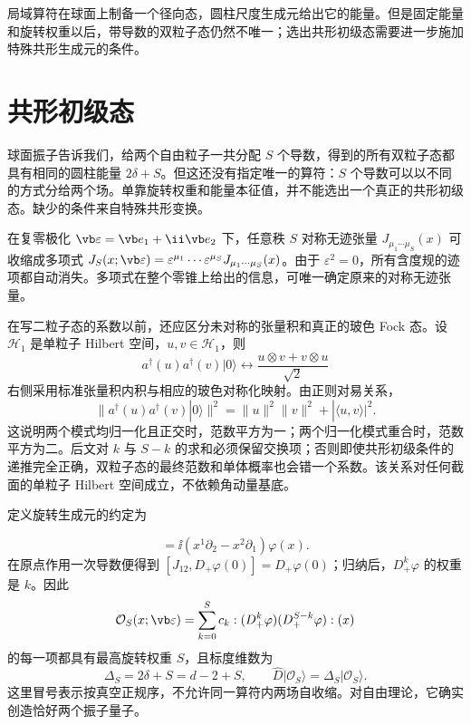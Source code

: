 

局域算符在球面上制备一个径向态，圆柱尺度生成元给出它的能量。但是固定能量和旋转权重以后，带导数的双粒子态仍然不唯一；选出共形初级态需要进一步施加特殊共形生成元的条件。

\section{共形初级态}
\label{sec:ghs-conformal-primary-bilinear}


球面振子告诉我们，给两个自由粒子一共分配 $S$ 个导数，得到的所有双粒子态都具有相同的圆柱能量 $2\delta+S$。但这还没有指定唯一的算符：$S$ 个导数可以以不同的方式分给两个场。单靠旋转权重和能量本征值，并不能选出一个真正的共形初级态。缺少的条件来自特殊共形变换。


在复零极化 $\vb\varepsilon=\vb e_1+\ii\vb e_2$ 下，任意秩 $S$ 对称无迹张量 $J_{\mu_1\cdots\mu_S}(x)$ 可收缩成多项式 $J_S(x;\vb\varepsilon)=\varepsilon^{\mu_1}\cdots\varepsilon^{\mu_S}J_{\mu_1\cdots\mu_S}(x)$。由于 $\varepsilon^2=0$，所有含度规的迹项都自动消失。多项式在整个零锥上给出的信息，可唯一确定原来的对称无迹张量。

在写二粒子态的系数以前，还应区分未对称的张量积和真正的玻色 Fock 态。设 $\mathcal H_1$ 是单粒子 Hilbert 空间，$u,v\in\mathcal H_1$，则
\[
 a^\dagger(u)a^\dagger(v)|0\rangle
 \longleftrightarrow \frac{u\otimes v+v\otimes u}{\sqrt2}
\]
右侧采用标准张量积内积与相应的玻色对称化映射。由正则对易关系，
\[
 \|a^\dagger(u)a^\dagger(v)|0\rangle\|^2
 =\|u\|^2\|v\|^2+|\langle u,v\rangle|^2.
\]
这说明两个模式均归一化且正交时，范数平方为一；两个归一化模式重合时，范数平方为二。后文对 $k$ 与 $S-k$ 的求和必须保留交换项；否则即使共形初级条件的递推完全正确，双粒子态的最终范数和单体概率也会错一个系数。该关系对任何截面的单粒子 Hilbert 空间成立，不依赖角动量基底。

定义旋转生成元的约定为




\begin{equation*}
 [J_{12},\varphi(x)]=\ii(x^1\partial_2-x^2\partial_1)\varphi(x).
\end{equation*}
在原点作用一次导数便得到 $[J_{12},D_+\varphi(0)]=D_+\varphi(0)$；归纳后，$D_+^k\varphi$ 的权重是 $k$。因此
\begin{equation}\label{eq:ghs-bilinear-general}
 \mathcal O_S(x;\vb\varepsilon)=\sum_{k=0}^{S}c_k:
 (D_+^k\varphi)(D_+^{S-k}\varphi):(x)
\end{equation}
的每一项都具有最高旋转权重 $S$，且标度维数为
\begin{equation}\label{eq:ghs-spin-energy}
 \Delta_S=2\delta+S=d-2+S,\qquad
 \widehat D|\mathcal O_S\rangle=\Delta_S|\mathcal O_S\rangle.
\end{equation}
这里冒号表示按真空正规序，不允许同一算符内两场自收缩。对自由理论，它确实创造恰好两个振子量子。


